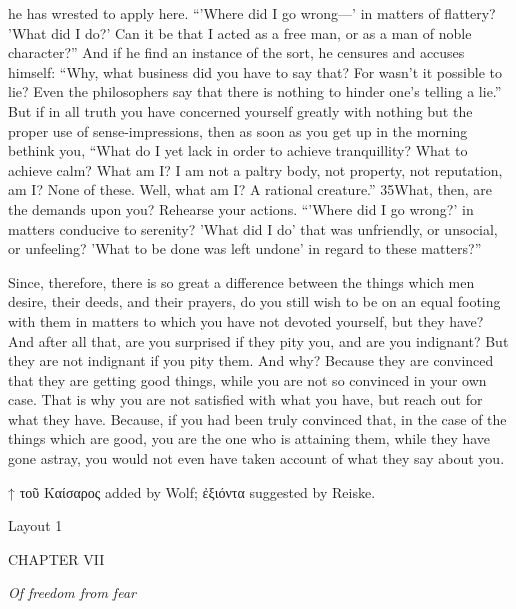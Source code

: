 he has wrested to apply here. ``'Where did I go wrong—' in matters of flattery? 'What did I do?' Can it be that I acted as a free man, or as a man of noble character?'' And if he find an instance of the sort, he censures and accuses himself: ``Why, what business did you have to say that? For wasn't it possible to lie? Even the philosophers say that there is nothing to hinder one's telling a lie.'' But if in all truth you have concerned yourself greatly with nothing but the proper use of sense-impressions, then as soon as you get up in the morning bethink you, ``What do I yet lack in order to achieve tranquillity? What to achieve calm? What am I? I am not a paltry body, not property, not reputation, am I? None of these. Well, what am I? A rational creature.'' 35What, then, are the demands upon you? Rehearse your actions. ``'Where did I go wrong?' in matters conducive to serenity? 'What did I do' that was unfriendly, or unsocial, or unfeeling? 'What to be done was left undone' in regard to these matters?''

Since, therefore, there is so great a difference between the things which men desire, their deeds, and their prayers, do you still wish to be on an equal footing with them in matters to which you have not devoted yourself, but they have? And after all that, are you surprised if they pity you, and are you indignant? But they are not indignant if you pity them. And why? Because they are convinced that they are getting good things, while you are not so convinced in your own case. That is why you are not satisfied with what you have, but reach out for what they have. Because, if you had been truly convinced that, in the case of the things which are good, you are the one who is attaining them, while they have gone astray, you would not even have taken account of what they say about you.



↑ τοῦ Καίσαρος added by Wolf; ἐξιόντα suggested by Reiske.


Layout 1

CHAPTER VII

\emph{Of freedom from fear}

